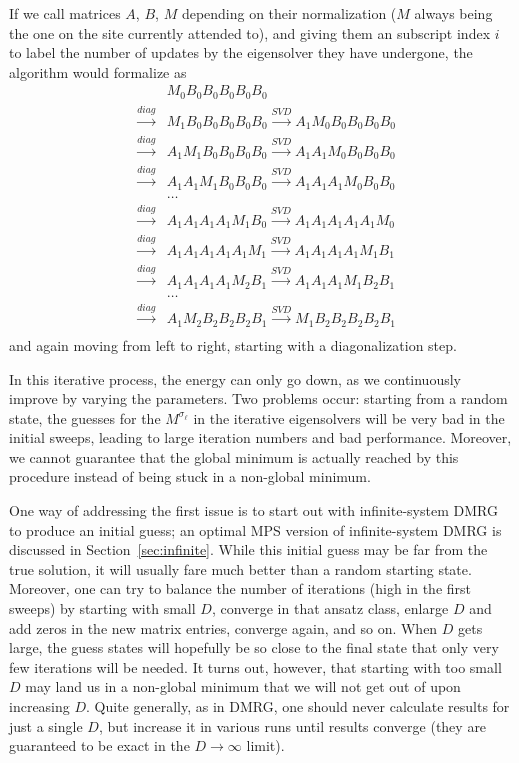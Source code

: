 If we call matrices $A$, $B$, $M$ depending on their normalization ($M$ always being the one on the site currently attended to), and giving them an subscript index $i$ to label the number of updates by the eigensolver they have undergone, the algorithm would formalize as
\begin{eqnarray*}
& & M_0 B_0 B_0 B_0 B_0 B_0 \\
&\stackrel{diag}{\rightarrow}& M_1 B_0 B_0 B_0 B_0 B_0 
\stackrel{SVD}{\rightarrow} A_1 M_0 B_0 B_0 B_0 B_0 \\
&\stackrel{diag}{\rightarrow}& A_1 M_1 B_0 B_0 B_0 B_0 
\stackrel{SVD}{\rightarrow} A_1 A_1 M_0 B_0 B_0 B_0 \\
&\stackrel{diag}{\rightarrow}& A_1 A_1 M_1 B_0 B_0 B_0 
\stackrel{SVD}{\rightarrow} A_1 A_1 A_1 M_0 B_0 B_0 \\
& & \ldots \\
&\stackrel{diag}{\rightarrow}& A_1 A_1 A_1 A_1 M_1 B_0 
\stackrel{SVD}{\rightarrow} A_1 A_1 A_1 A_1 A_1 M_0 \\
&\stackrel{diag}{\rightarrow}& A_1 A_1 A_1 A_1 A_1 M_1 
\stackrel{SVD}{\rightarrow} A_1 A_1 A_1 A_1 M_1 B_1 \\
&\stackrel{diag}{\rightarrow}& A_1 A_1 A_1 A_1 M_2 B_1 
\stackrel{SVD}{\rightarrow} A_1 A_1 A_1 M_1 B_2 B_1 \\
& & \ldots \\
&\stackrel{diag}{\rightarrow}& A_1 M_2 B_2 B_2 B_2 B_1 
\stackrel{SVD}{\rightarrow} M_1 B_2 B_2 B_2 B_2 B_1 \\
\end{eqnarray*}
and again moving from left to right, starting with a diagonalization step.

In this iterative process, the energy can only go down, as we continuously improve by varying the parameters. Two problems occur: starting from a random state, the guesses for the $M^{\sigma_\ell}$ in the iterative eigensolvers will be very bad in the initial sweeps, leading to large iteration numbers and bad performance. Moreover, we cannot guarantee that the global minimum is actually reached by this procedure instead of being stuck in a non-global minimum.

One way of addressing the first issue is to start out with infinite-system DMRG to produce an initial guess; an optimal MPS version of infinite-system DMRG is discussed in Section~\ref{sec:infinite}. While this initial guess may be far from the true solution, it will usually fare much better than a random starting state. Moreover, one can try to balance the number of iterations (high in the first sweeps) by starting with small $D$, converge in that ansatz class, enlarge $D$ and add zeros in the new matrix entries, converge again, and so on. When $D$ gets large, the guess states will hopefully be so close to the final state that only very few iterations will be needed. It turns out, however, that starting with too small $D$ may land us in a non-global minimum that we will not get out of upon increasing $D$. Quite generally, as in DMRG, one should never calculate results for just a single $D$, but increase it in various runs until results converge (they are guaranteed to be exact in the $D\rightarrow\infty$ limit).

